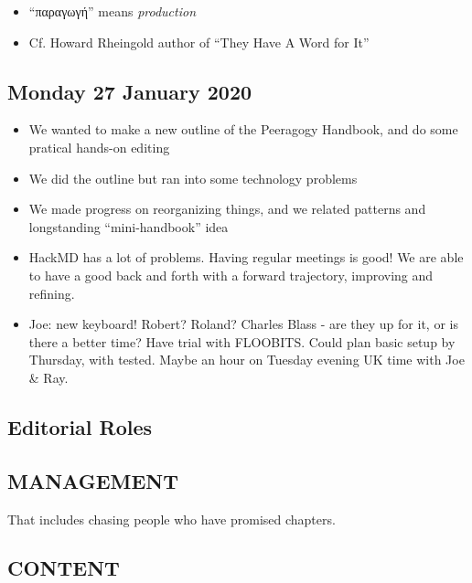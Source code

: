 \begin{itemize}
\tightlist
\item
  ``παραγωγή'' means \emph{production}
\item
  Cf. Howard Rheingold author of ``They Have A Word for It''
\end{itemize}

\hypertarget{monday-27-january-2020}{%
\subsection{Monday 27 January 2020}\label{monday-27-january-2020}}

\begin{itemize}
\tightlist
\item
  We wanted to make a new outline of the Peeragogy Handbook, and do some
  pratical hands-on editing
\item
  We did the outline but ran into some technology problems
\item
  We made progress on reorganizing things, and we related patterns and
  longstanding ``mini-handbook'' idea
\item
  HackMD has a lot of problems. Having regular meetings is good! We are
  able to have a good back and forth with a forward trajectory,
  improving and refining.
\item
  Joe: new keyboard! Robert? Roland? Charles Blass - are they up for it,
  or is there a better time? Have trial with FLOOBITS. Could plan basic
  setup by Thursday, with tested. Maybe an hour on Tuesday evening UK
  time with Joe \& Ray.
\end{itemize}

\hypertarget{editorial-roles}{%
\subsection{Editorial Roles}\label{editorial-roles}}

\hypertarget{management}{%
\subsection{MANAGEMENT}\label{management}}

That includes chasing people who have promised chapters.

\hypertarget{content}{%
\subsection{CONTENT}\label{content}}

